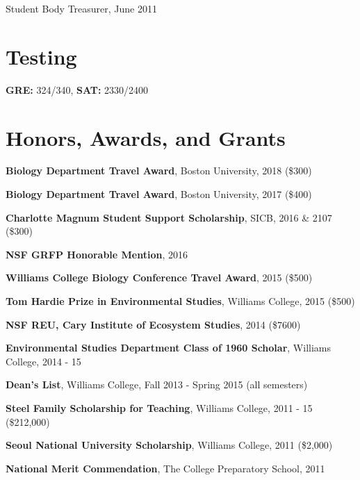 \documentclass[margin,line]{res}
\begin{document}
\begin{resume}
\vspace*{-4mm}
Student Body Treasurer, June 2011 

\section{\sc Testing} 
{\bf GRE:} 324/340, 
{\bf SAT:} 2330/2400

\section{\sc Honors, Awards, and Grants} 

{\bf Biology Department Travel Award}, Boston University, 2018 (\$300)
\vspace*{-3.5mm}

{\bf Biology Department Travel Award}, Boston University, 2017 (\$400)
\vspace*{-3.5mm}

{\bf Charlotte  Magnum	Student	Support	Scholarship}, SICB, 2016 \& 2107 (\$300)
\vspace*{-3.5mm}

{\bf NSF GRFP Honorable Mention}, 2016 
\vspace*{-3.5mm}

{\bf Williams College Biology Conference Travel Award}, 2015 (\$500)
\vspace*{-3.5mm}

{\bf Tom Hardie Prize in Environmental Studies}, Williams College, 2015 (\$500)
\vspace*{-3.5mm}

{\bf NSF REU, Cary Institute of Ecosystem Studies}, 2014 (\$7600)
\vspace*{-3.5mm}

{\bf Environmental Studies Department Class of 1960 Scholar}, Williams College, 2014 - 15
\vspace*{-3.5mm}

{\bf Dean's List}, Williams College, Fall 2013 - Spring 2015 (all semesters)
\vspace*{-3.5mm}

{\bf Steel Family Scholarship for Teaching}, Williams College, 2011 - 15 (\$212,000)
\vspace*{-3.5mm}

{\bf Seoul National University Scholarship}, Williams College, 2011 (\$2,000)
\vspace*{-3.5mm}

{\bf National Merit Commendation}, The College Preparatory School, 2011



\end{resume}
\end{document}
